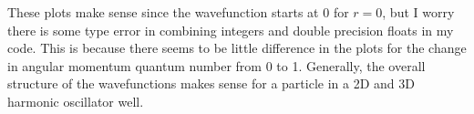 \documentclass[12pt]{article}
\begin{document}
\begin{enumerate}
These plots make sense since the wavefunction starts at 0 for $r=0$, but I worry there is some type error in combining integers and double precision floats
in my code. This is because there seems to be little difference in the plots for the change in angular momentum quantum number from 0 to 1. Generally, the 
overall structure of the wavefunctions makes sense for a particle in a 2D and 3D harmonic oscillator well.

\end{enumerate}

 
 
\end{document}
